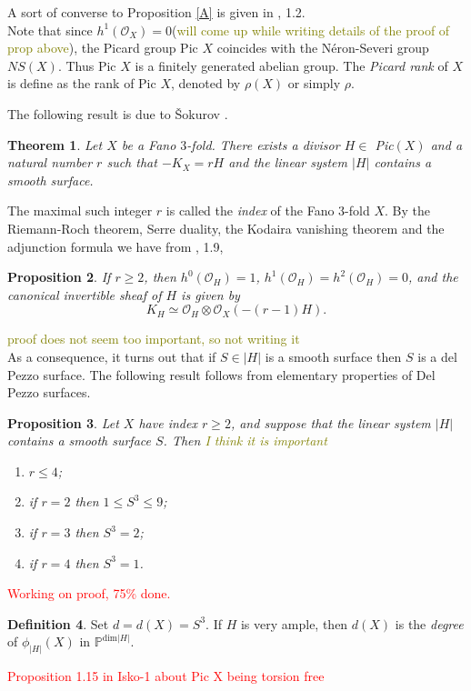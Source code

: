 \documentclass[11pt]{amsart}
\theoremstyle{plain}
\newtheorem{theorem}{Theorem}[section]
\newtheorem{proposition}[theorem]{Proposition}
\theoremstyle{definition}
\newtheorem{definition}[theorem]{Definition}
\theoremstyle{expl}
\begin{document}
A sort of converse to Proposition \ref{A} is given in \cite{Isk78}, 1.2.\\
\noindent Note that since $h^1(\mathcal{O}_X)=0$(\textcolor{olive}{will come up while writing details of the proof of prop above}), the Picard group Pic $X$ coincides with the N\'{e}ron-Severi group $NS(X)$. Thus Pic $X$ is a finitely generated abelian group. The \textit{Picard rank} of $X$ is define as the rank of Pic $X$, denoted by $\rho(X)$ or simply $\rho$.

\noindent The following result is due to \v{S}okurov \cite{Sokudivisor}.
\begin{theorem}
\label{B}
Let $X$ be a Fano $3$-fold. There exists a divisor $H \in$ Pic$(X)$ and a natural number $r$ such that $-K_X = rH$ and the linear system $|H|$ contains a smooth surface.
\end{theorem}
The maximal such integer $r$ is called the \textit{index} of the Fano $3$-fold $X$. 
By the Riemann-Roch theorem, Serre duality, the Kodaira vanishing theorem and the adjunction formula we have from \cite{Isk77}, 1.9,
\begin{proposition}
    If $r \geq 2$, then $h^0(\mathcal{O}_H) = 1$, $h^1(\mathcal{O}_H) = h^2(\mathcal{O}_H)=0$, and the canonical invertible sheaf of $H$ is given by 
    \[
    K_{H} \simeq \mathcal{O}_H \otimes \mathcal{O}_X(-(r-1)H).
    \]
\end{proposition}
\textcolor{olive}{proof does not seem too important, so not writing it}\\
\noindent As a consequence, it turns out that if $S \in |H|$ is a smooth surface then $S$ is a del Pezzo surface.
\noindent The following result follows from elementary properties of Del Pezzo surfaces.
\begin{proposition}
    Let $X$ have index $r\geq 2$, and suppose that the linear system $|H|$ contains a smooth surface $S$. Then \textcolor{olive}{I think it is important}
    \begin{enumerate}
        \item[(i)] $r \leq 4$;
        \item[(ii)] if $r=2$ then $1 \leq S^3 \leq 9$;
        \item[(ii)] if $r=3$ then $S^3=2$;
        \item[(iv)] if $r=4$ then $S^3=1$.
    \end{enumerate}
\end{proposition}
\textcolor{red}{Working on proof, 75\% done.}

\begin{definition}
    Set $d = d(X) =S^3$. If $H$ is very ample, then $d(X)$ is the \textit{degree} of $\phi_{|H|}(X)$ in $\mathbb{P}^{\text{dim}|H|}$.
\end{definition}
\textcolor{red}{Proposition 1.15 in Isko-1 about Pic X being torsion free}
 
\end{document}
